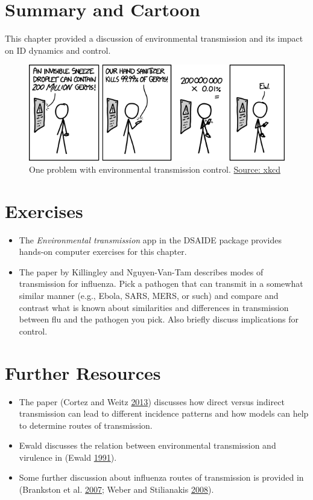 \documentclass[]{book}
\providecommand{\tightlist}{%
  \setlength{\itemsep}{0pt}\setlength{\parskip}{0pt}}
\theoremstyle{definition}
\theoremstyle{definition}
\theoremstyle{definition}
\theoremstyle{remark}
\begin{document}
\section{Summary and Cartoon}\label{summary-and-cartoon-6}

This chapter provided a discussion of environmental transmission and its
impact on ID dynamics and control.

\begin{figure}
\centering
\includegraphics{./images/xkcd-hand_sanitizer.png}
\caption{One problem with environmental transmission control.
\href{https://xkcd.com/1161/}{Source: xkcd}}
\end{figure}

\section{Exercises}\label{exercises-6}

\begin{itemize}
\tightlist
\item
  The \emph{Environmental transmission} app in the DSAIDE package
  provides hands-on computer exercises for this chapter.
\item
  The paper by Killingley and Nguyen-Van-Tam describes modes of
  transmission for influenza. Pick a pathogen that can transmit in a
  somewhat similar manner (e.g., Ebola, SARS, MERS, or such) and compare
  and contrast what is known about similarities and differences in
  transmission between flu and the pathogen you pick. Also briefly
  discuss implications for control.
\end{itemize}

\section{Further Resources}\label{further-resources-6}

\begin{itemize}
\tightlist
\item
  The paper (Cortez and Weitz \protect\hyperlink{ref-cortez13}{2013})
  discusses how direct versus indirect transmission can lead to
  different incidence patterns and how models can help to determine
  routes of transmission.
\item
  Ewald discusses the relation between environmental transmission and
  virulence in (Ewald \protect\hyperlink{ref-ewald91}{1991}).
\item
  Some further discussion about influenza routes of transmission is
  provided in (Brankston et al.
  \protect\hyperlink{ref-brankston07}{2007}; Weber and Stilianakis
  \protect\hyperlink{ref-weber08}{2008}).
\end{itemize}
\end{document}
